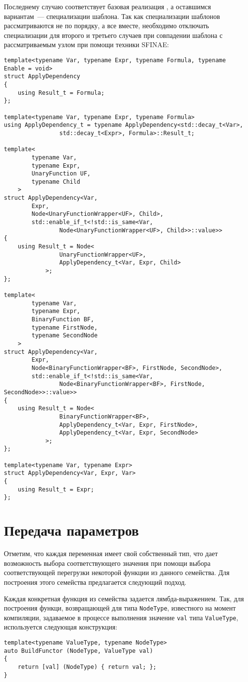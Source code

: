 \documentclass[11pt,a4paper]{article}
\begin{document}
Последнему случаю соответствует базовая реализация , а оставшимся
вариантам~--- специализации шаблона. Так как специализации шаблонов рассматриваются
не по порядку, а все вместе, необходимо отключать специализации для второго и третьего
случаев при совпадении шаблона с рассматриваемым узлом при помощи техники SFINAE\cite{Josuttis2003Templates}:

\begin{lstlisting}
template<typename Var, typename Expr, typename Formula, typename Enable = void>
struct ApplyDependency
{
	using Result_t = Formula;
};

template<typename Var, typename Expr, typename Formula>
using ApplyDependency_t = typename ApplyDependency<std::decay_t<Var>,
				std::decay_t<Expr>, Formula>::Result_t;

template<
		typename Var,
		typename Expr,
		UnaryFunction UF,
		typename Child
	>
struct ApplyDependency<Var,
		Expr,
		Node<UnaryFunctionWrapper<UF>, Child>,
		std::enable_if_t<!std::is_same<Var,
				Node<UnaryFunctionWrapper<UF>, Child>>::value>>
{
	using Result_t = Node<
				UnaryFunctionWrapper<UF>,
				ApplyDependency_t<Var, Expr, Child>
			>;
};

template<
		typename Var,
		typename Expr,
		BinaryFunction BF,
		typename FirstNode,
		typename SecondNode
	>
struct ApplyDependency<Var,
		Expr,
		Node<BinaryFunctionWrapper<BF>, FirstNode, SecondNode>,
		std::enable_if_t<!std::is_same<Var,
				Node<BinaryFunctionWrapper<BF>, FirstNode, SecondNode>>::value>>
{
	using Result_t = Node<
				BinaryFunctionWrapper<BF>,
				ApplyDependency_t<Var, Expr, FirstNode>,
				ApplyDependency_t<Var, Expr, SecondNode>
			>;
};

template<typename Var, typename Expr>
struct ApplyDependency<Var, Expr, Var>
{
	using Result_t = Expr;
};
\end{lstlisting}

\section{Передача параметров}

Отметим, что каждая переменная имеет свой собственный тип, что дает возможность
выбора соответствующего значения при помощи выбора соответствующей перегрузки
некоторой функции из данного семейства. Для построения этого семейства предлагается
следующий подход.

Каждая конкретная функция из семейства задается лямбда-выражением. Так, для
построения функци, возвращающей для типа \texttt{NodeType}, известного на момент
компиляции, задаваемое в процессе выполнения значение \texttt{val} типа
\texttt{ValueType}, используется следующая конструкция:
\begin{lstlisting}
template<typename ValueType, typename NodeType>
auto BuildFunctor (NodeType, ValueType val)
{
    return [val] (NodeType) { return val; };
}
\end{lstlisting}
\end{document}
